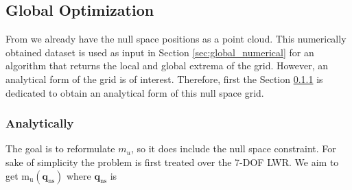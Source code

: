 %
%
%








\subsection{Global Optimization}
\label{ch:globaloptimization}
\label{sec:globaloptimization}


From \cite{fabianthesis} we already have the null space positions as a point cloud. This numerically obtained dataset is used as input in Section \ref{sec:global_numerical} for an algorithm that returns the local and global extrema of the grid. However, an analytical form of the grid is of interest. Therefore, first the Section \ref{sec:global_analytical} is dedicated to obtain an analytical form  of this null space grid.




\subsubsection{Analytically}
\label{sec:global_analytical}



\label{subsec:imposing_ns_constraint}


The goal is to reformulate $m_u$, so it does include the null space constraint. 
For sake of simplicity the problem is first treated over the 7-DOF LWR.  We aim to get $\mathrm{m_u(\mathbf{q}_{ns})}$ where $\mathrm{\mathbf{q}_{ns}}$ is


